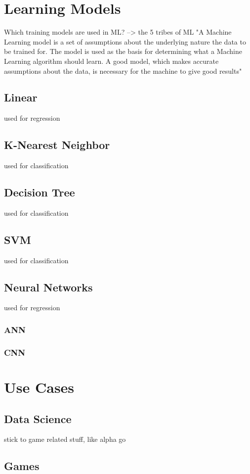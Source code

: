 \documentclass[MGS,Master,english]{twbook}%
\begin{document}
\section{Learning Models}
Which training models are used in ML? --> the 5 tribes of ML
"A Machine Learning model is a set of assumptions about the underlying nature the data to be trained for. The model is used as the basis for determining what a Machine Learning algorithm should learn. A good model, which makes accurate assumptions about the data, is necessary for the machine to give good results" \cite{ml:3}
\subsection{Linear}
used for regression \cite{ml:2}
\subsection{K-Nearest Neighbor}
used for classification \cite{ml:2}
\subsection{Decision Tree}
used for classification \cite{ml:2}
\subsection{\acl{SVM}}
used for classification \cite{ml:2}
\subsection{Neural Networks}
used for regression \cite{ml:2}
\subsubsection{\acl{ANN}}
\subsubsection{\acl{CNN}}

\section{Use Cases}
\subsection{Data Science}
stick to game related stuff, like alpha go
\subsection{Games}
\end{document}
